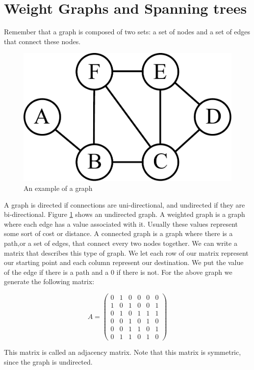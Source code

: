\label{Ch:Kruskal}


\section*{Weight Graphs and Spanning trees}


Remember that a graph is composed of two sets: a set of nodes and a set of edges that connect these nodes. 

\begin{figure}[H]
\includegraphics[width = .4\textwidth]{graph1.pdf}
\caption{An example of a graph}
\label{mst:graph1}
\end{figure}

A graph is directed if connections are uni-directional, and undirected if they are bi-directional.
Figure \ref{mst:graph1} shows an undirected graph.
A weighted graph is a graph where each edge has a value associated with it.
Usually these values represent some sort of cost or distance.
A connected graph is a graph where there is a path,or a set of edges, that connect every two nodes together.
We can write a matrix that describes this type of graph.
We let each row of our matrix represent our starting point and each column represent our destination.
We put the value of the edge if there is a path and a 0 if there is not.
For the above graph we generate the following matrix:

\[
A = \begin{pmatrix}
0 & 1 & 0 & 0 & 0 & 0\\
1 & 0 & 1 & 0 & 0 & 1\\
0 & 1 & 0 & 1 & 1 & 1\\
0 & 0 & 1 & 0 & 1 & 0\\
0 & 0 & 1 & 1 & 0 & 1\\
0 & 1 & 1 & 0 & 1 & 0
\end{pmatrix}
\]

This matrix is called an adjacency matrix.
Note that this matrix is symmetric, since the graph is undirected. 

